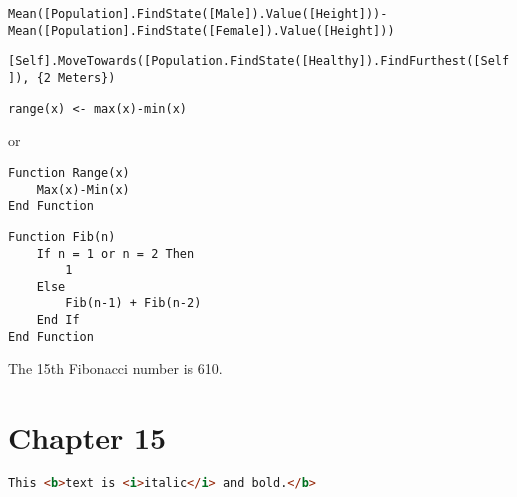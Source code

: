 \documentclass[]{memoir}
\begin{document}
\lstinline!Mean([Population].FindState([Male]).Value([Height]))-Mean([Population].FindState([Female]).Value([Height]))!


\lstinline![Self].MoveTowards([Population.FindState([Healthy]).FindFurthest([Self]), {2 Meters})!


\lstinline!range(x) <- max(x)-min(x)!

or

\begin{lstlisting}
Function Range(x)
    Max(x)-Min(x)
End Function
\end{lstlisting}


\begin{lstlisting}
Function Fib(n)
    If n = 1 or n = 2 Then
        1
    Else
        Fib(n-1) + Fib(n-2)
    End If
End Function
\end{lstlisting}

The 15th Fibonacci number is 610.

\section{Chapter 15}


\begin{lstlisting}[language=HTML]
This <b>text is <i>italic</i> and bold.</b>
\end{lstlisting}

\end{document}
